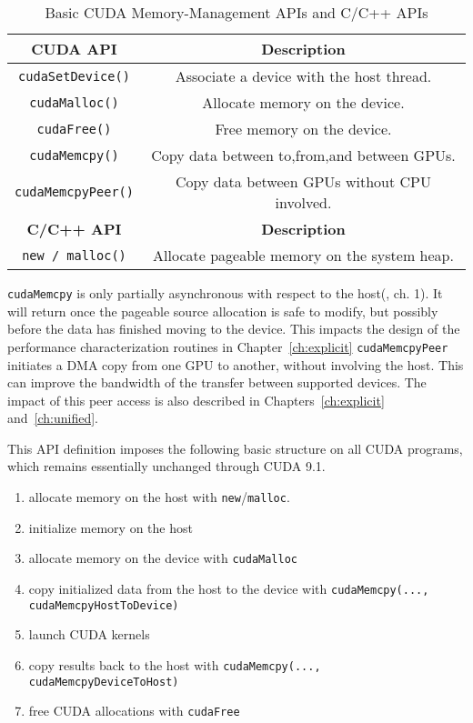 \begin{table}[ht]
	\centering
	\caption[Basic Memory-management APIs]{
		Basic CUDA Memory-Management APIs and C/C++ APIs
	}
	\label{tab:cuda-basic-apis}
	\begin{tabular}{cc}
		\hline
		\textbf{CUDA API}          & \textbf{Description}                         \\ \hline
		\texttt{cudaSetDevice()}   & Associate a device with the host thread.     \\ \hline
		\texttt{cudaMalloc()}      & Allocate memory on the device.               \\ \hline
		\texttt{cudaFree()}        & Free memory on the device.                   \\ \hline
		\texttt{cudaMemcpy()}      & Copy data between to,from,and between GPUs.  \\ \hline
		\texttt{cudaMemcpyPeer()}  & Copy data between GPUs without CPU involved. \\ \hline
		\hline 
		\textbf{C/C++ API}         & \textbf{Description}                         \\ \hline
		\texttt{new / malloc()}    & Allocate pageable memory on the system heap. \\ \hline
	\end{tabular}
\end{table}

\texttt{cudaMemcpy} is only partially asynchronous with respect to the host(\cite{nvidia2014cuda60runtime}, ch. 1).
It will return once the pageable source allocation is safe to modify, but possibly before the data has finished moving to the device.
This impacts the design of the performance characterization routines in Chapter~\ref{ch:explicit}
\texttt{cudaMemcpyPeer} initiates a DMA copy from one GPU to another, without involving the host.
This can improve the bandwidth of the transfer between supported devices.
The impact of this peer access is also described in Chapters~\ref{ch:explicit} and~\ref{ch:unified}.

This API definition imposes the following basic structure on all CUDA programs, which remains essentially unchanged through CUDA 9.1.
\begin{enumerate}
	\item allocate memory on the host with \texttt{new}/\texttt{malloc}.
	\item initialize memory on the host
	\item allocate memory on the device with \texttt{cudaMalloc}
	\item copy initialized data from the host to the device with 
	\newline \texttt{cudaMemcpy(..., cudaMemcpyHostToDevice)}
	\item launch CUDA kernels
	\item copy results back to the host with 
	\newline \texttt{cudaMemcpy(..., cudaMemcpyDeviceToHost)}
	\item free CUDA allocations with \texttt{cudaFree}
\end{enumerate}

